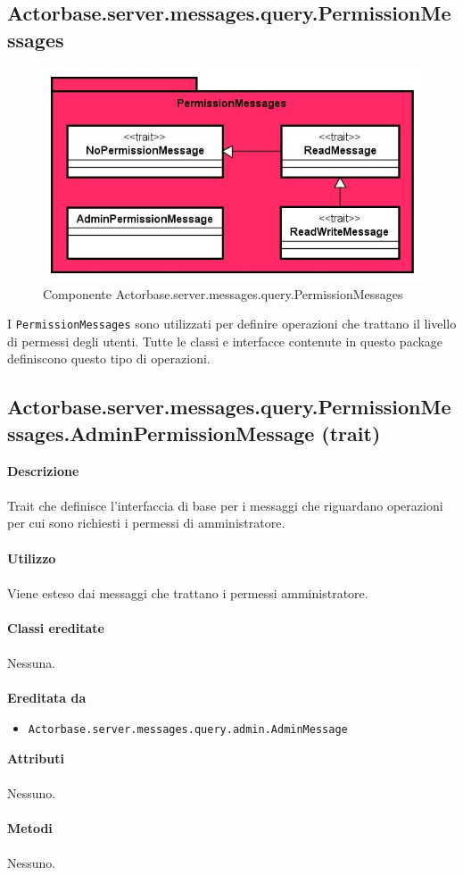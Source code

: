 \documentclass[a4paper]{article}
\begin{document}
	\subsection{Actorbase.server.messages.query.PermissionMessages}
			\begin{figure}[H]
			\centering
			\includegraphics[width=\textwidth]{Server/permissionMessagesLevel.jpg}
			\caption{Componente Actorbase.server.messages.query.PermissionMessages}
		\end{figure}
		I \texttt{PermissionMessages} sono utilizzati per definire operazioni che trattano il livello di permessi degli utenti. Tutte le classi e interfacce contenute in questo package definiscono questo tipo di operazioni.
		
	\subsection{Actorbase.server.messages.query.PermissionMessages.AdminPermissionMessage (trait)}
		\textbf{Descrizione}
			\\ \\
			Trait che definisce l'interfaccia di base per i messaggi che riguardano operazioni per cui sono richiesti i permessi di amministratore.
			\\ \\
		\textbf{Utilizzo}
			\\ \\
			Viene esteso dai messaggi che trattano i permessi amministratore.
			\\ \\
		\textbf{Classi ereditate}
			\\ \\
			Nessuna.
			\\ \\
		\textbf{Ereditata da}
			\begin{itemize}
				\item \texttt{Actorbase.server.messages.query.admin.AdminMessage}
			\end{itemize}
		\textbf{Attributi}
			\\ \\
			Nessuno.
			\\ \\
		\textbf{Metodi}
			\\ \\
			Nessuno.
			
\end{document}
